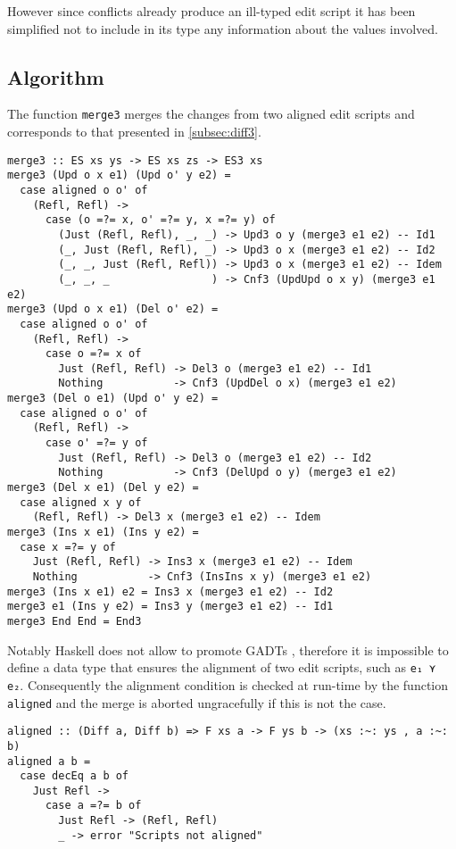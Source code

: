 \documentclass[../Thesis.tex]{subfiles}
\begin{document}
	However since conflicts already produce an ill-typed edit script
	it has been simplified not to include
	in its type any information about the values involved.
		
	\subsection{Algorithm}
	\label{subsec:Diff3Algo}
	The function \texttt{merge3} merges the changes from 
	two aligned edit scripts and corresponds to that presented
	in \ref{subsec:diff3}.

\begin{verbatim}
merge3 :: ES xs ys -> ES xs zs -> ES3 xs
merge3 (Upd o x e1) (Upd o' y e2) =
  case aligned o o' of
    (Refl, Refl) ->
      case (o =?= x, o' =?= y, x =?= y) of
        (Just (Refl, Refl), _, _) -> Upd3 o y (merge3 e1 e2) -- Id1
        (_, Just (Refl, Refl), _) -> Upd3 o x (merge3 e1 e2) -- Id2
        (_, _, Just (Refl, Refl)) -> Upd3 o x (merge3 e1 e2) -- Idem
        (_, _, _                ) -> Cnf3 (UpdUpd o x y) (merge3 e1 e2)
merge3 (Upd o x e1) (Del o' e2) =
  case aligned o o' of
    (Refl, Refl) -> 
      case o =?= x of
        Just (Refl, Refl) -> Del3 o (merge3 e1 e2) -- Id1
        Nothing           -> Cnf3 (UpdDel o x) (merge3 e1 e2)
merge3 (Del o e1) (Upd o' y e2) = 
  case aligned o o' of
    (Refl, Refl) -> 
      case o' =?= y of
        Just (Refl, Refl) -> Del3 o (merge3 e1 e2) -- Id2
        Nothing           -> Cnf3 (DelUpd o y) (merge3 e1 e2)
merge3 (Del x e1) (Del y e2) =
  case aligned x y of
    (Refl, Refl) -> Del3 x (merge3 e1 e2) -- Idem
merge3 (Ins x e1) (Ins y e2) =
  case x =?= y of
    Just (Refl, Refl) -> Ins3 x (merge3 e1 e2) -- Idem
    Nothing           -> Cnf3 (InsIns x y) (merge3 e1 e2)
merge3 (Ins x e1) e2 = Ins3 x (merge3 e1 e2) -- Id2
merge3 e1 (Ins y e2) = Ins3 y (merge3 e1 e2) -- Id1
merge3 End End = End3
\end{verbatim}

	Notably Haskell does not allow to promote GADTs \cite{Yorgey12}, 
	therefore it is impossible to define a data type that ensures the
	alignment of two edit scripts, such as \texttt{e₁ ⋎ e₂}.
	Consequently the alignment condition is checked at
	run-time by the function \texttt{aligned} 
	and the merge is aborted ungracefully if this is not the case.

\begin{verbatim}
aligned :: (Diff a, Diff b) => F xs a -> F ys b -> (xs :~: ys , a :~: b)
aligned a b =
  case decEq a b of
    Just Refl ->  
      case a =?= b of
        Just Refl -> (Refl, Refl)
        _ -> error "Scripts not aligned"
\end{verbatim} 
\end{document}
